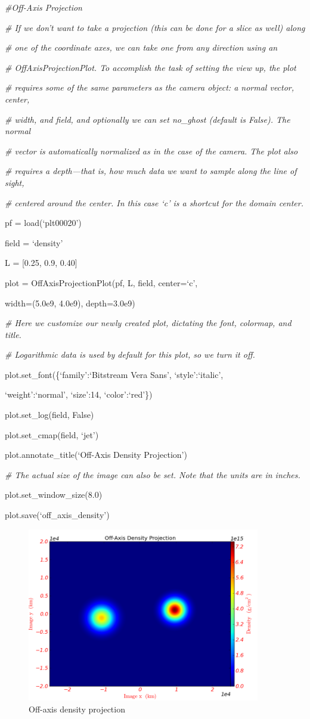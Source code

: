 {\it\#Off-Axis Projection}
{\setlength{\parskip}{0pt}

{\it\# If we don't want to take a projection (this can be done for a slice as well) along}

{\it\# one of the coordinate axes, we can take one from any direction using an}

{\it\# OffAxisProjectionPlot. To accomplish the task of setting the view up, the plot}

{\it\# requires some of the same parameters as the camera object: a normal vector, center,}

{\it\# width, and field, and optionally we can set no\_ghost (default is False). The normal}

{\it\# vector is automatically normalized as in the case of the camera. The plot also}

{\it\# requires a depth---that is, how much data we want to sample along the line of sight,}

{\it\# centered around the center. In this case `c' is a shortcut for the domain center.}

pf = load(`plt00020')
}

field = `density'

L = [0.25, 0.9, 0.40]

plot = OffAxisProjectionPlot(pf, L, field, center=`c',

{\setlength{\parindent}{146pt}width=(5.0e9, 4.0e9), depth=3.0e9)}

{\it\# Here we customize our newly created plot, dictating the font, colormap, and title.}
{\setlength{\parskip}{0pt}

{\it\# Logarithmic data is used by default for this plot, so we turn it off.}

plot.set\_font(\{`family':`Bitstream Vera Sans', `style':`italic',
}

{\setlength{\parindent}{63.5pt}`weight':`normal', `size':14, `color':`red'\})}

plot.set\_log(field, False)

plot.set\_cmap(field, `jet')

plot.annotate\_title(`Off-Axis Density Projection')

{\it\# The actual size of the image can also be set. Note that the units are in inches.}
{\setlength{\parskip}{0pt}

plot.set\_window\_size(8.0)
}

plot.save(`off\_axis\_density')
\begin{figure}[h]
  \centering
  \includegraphics[width=4in]{OffAxisProjection_density}
  \caption{Off-axis density projection}
\end{figure}


